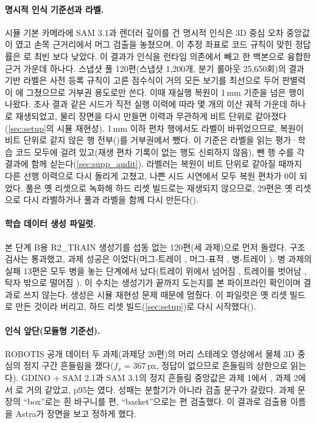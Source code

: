 \paragraph{명시적 인식 기준선과 라벨.}
시뮬 기본 카메라에 SAM 3.1과 렌더러 깊이를 건 명시적 인식은 3D 중심 오차 중앙값이 였고 손목 근거리에서 머그 검출을  놓쳤으며, 이 추정 좌표로 코드 규칙이 맞힌 정답률은 로 최빈 보다 낮았다. 이 결과가 인식을 런타임 의존에서 빼고 한 백본으로 융합한 근거 가운데 하나다. 스냅샷 풀 120편(스냅샷 1,200개, 분기 롤아웃 25,650회)의 결과 기반 라벨은 사전 등록 규칙이 고른 점수식이 거의 모든 보기를 최선으로 두어 판별력이 에 그쳤으므로 거부권 용도로만 쓴다. 이때 재실행 복원이 1\,mm 기준을 넘은 행이  나왔다. 조사 결과 같은 시드가 직전 실행 이력에 따라 몇 개의 이산 궤적 가운데 하나로 재생되었고, 물리 장면을 다시 만들면 이력과 무관하게 비트 단위로 같아졌다(\cref{sec:setup}의 시뮬 재현성). 1\,mm 이하 편차 행에서도 라벨이 바뀌었으므로, 복원이 비트 단위로 같지 않은 행 전부()를 거부권에서 뺐다. 이 기준은 라벨을 읽는 평가·학습 코드 모두에 걸려 있고(재생 편차 기록이 없는 행도 신뢰하지 않음), 뺀 행 수를 각 결과에 함께 싣는다(\cref{sec:supp_audit}). 라벨러는 복원이 비트 단위로 같아질 때까지 다른 선행 이력으로 다시 돌리게 고쳤고, 나쁜 시드 시연에서  모두 복원 편차가 0이 되었다. 풀은 옛 리셋으로 녹화해 하드 리셋 빌드로는 재생되지 않으므로, 29편은 옛 리셋으로 다시 라벨하거나 풀과 라벨을 함께 다시 만든다().

\paragraph{학습 데이터 생성 파일럿.}
본 단계 B용 R2\_TRAIN 생성기를 섭동 없는 120편(세 과제)으로 먼저 돌렸다. 구조 검사는  통과했고, 과제 성공은 이었다(머그-트레이 , 머그-표적 , 병-트레이 ). 병 과제의 실패 13편은 모두 병을 놓는 단계에서 났다(트레이 위에서 넘어짐 , 트레이를 벗어남 , 탁자 밖으로 떨어짐 ). 이 수치는 생성기가 끝까지 도는지를 본 파이프라인 확인이며 결과로 쓰지 않는다. 생성은 시뮬 재현성 문제 때문에 멈췄다. 이 파일럿은 옛 리셋 빌드로 만든 것이라 버리고, 하드 리셋 빌드(\cref{sec:setup})로 다시 시작했다().

\paragraph{인식 앞단(모듈형 기준선).}
ROBOTIS 공개 데이터 두 과제(과제당 20편)의 머리 스테레오 영상에서 물체 3D 중심의 정지 구간 흔들림을 쟀다($f_x=367$\,px, 정답이 없으므로 흔들림의 상한으로 읽는다). GDINO + SAM 2.1과 SAM 3.1의 정지 흔들림 중앙값은 과제 1에서 , 과제 2에서 로 거의 같았고, p95는 였다. 성패는 분할기가 아니라 검출 문구가 갈랐다. 과제 문장의 ``box''로는 흰 바구니를 편, ``basket''으로는 편 검출했다. 이 결과로 검출용 이름을 Astra가 장면을 보고 정하게 했다.

